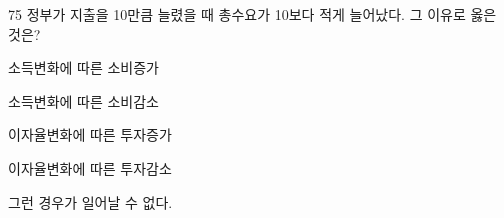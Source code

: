 \begin{question}{75}
정부가 지출을 10만큼 늘렸을 때 총수요가 10보다 적게 늘어났다. 그 이유로 옳은 것은?
\begin{choices}
  \item 소득변화에 따른 소비증가
  \item 소득변화에 따른 소비감소
  \item 이자율변화에 따른 투자증가
  \item 이자율변화에 따른 투자감소
  \item 그런 경우가 일어날 수 없다.
\end{choices}
\end{question}

